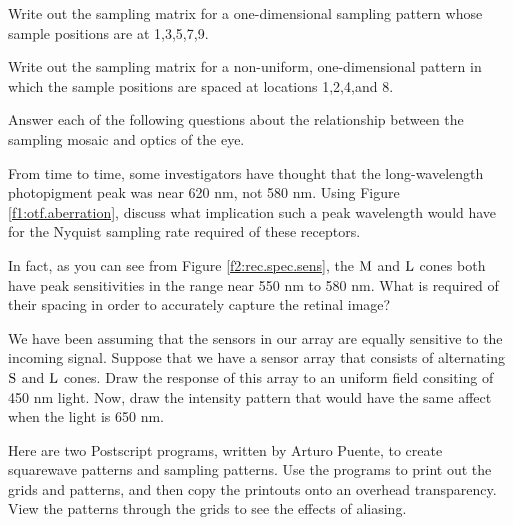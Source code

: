  \item Write out the sampling matrix for a one-dimensional
sampling pattern whose sample positions are at 1,3,5,7,9.

 \item Write out the sampling matrix for a non-uniform, one-dimensional
pattern in which the sample positions are spaced at locations
1,2,4,and 8.

 \ee

\item Answer each of the following questions
about the relationship between the
sampling mosaic and optics of the eye.

 \be

 \item From time to time, some investigators 
have thought that the long-wavelength
photopigment peak was near 620 nm, not 580 nm.
Using Figure \ref{f1:otf.aberration},
discuss what implication such a peak wavelength would
have for the Nyquist sampling rate
required of these receptors.

 \item In fact, as you can see from Figure \ref{f2:rec.spec.sens},
the $\mbox{M}$ and $\mbox{L}$ cones
both have peak sensitivities in the range near 550 nm to 580 nm.
What is required of their spacing in order to accurately
capture the retinal image?

 \item We have been assuming that the sensors in our array are
equally sensitive to the incoming signal.
Suppose that we have a sensor array that
consists of alternating $\mbox{S}$ and $\mbox{L}$ cones.
Draw the response of this array to an uniform field
consiting of 450 nm light.
Now, draw the intensity pattern
that would have the same affect
when the light is 650 nm.

 \ee

\item Here are two Postscript programs, written by Arturo Puente,
to create squarewave patterns and sampling patterns.
Use the programs to print out the grids and patterns,
and then copy the printouts onto an overhead transparency.
View the patterns through the grids to see the effects
of aliasing.

